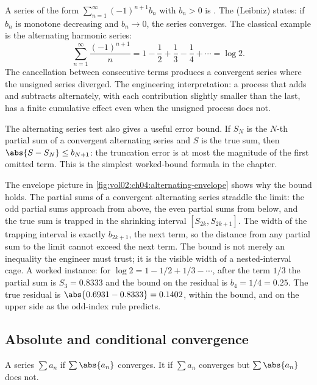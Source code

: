 A series of the form $\sum_{n=1}^{\infty} (-1)^{n+1} b_{n}$ with
$b_{n} > 0$ is . The  (Leibniz) states: if $b_{n}$ is monotone decreasing and
$b_{n} \to 0$, the series converges. The classical example is the
alternating harmonic series:
\[
\sum_{n=1}^{\infty} \frac{(-1)^{n+1}}{n} = 1 - \frac{1}{2} + \frac{1}{3}
- \frac{1}{4} + \cdots = \log 2.
\]
The cancellation between consecutive terms produces a convergent series
where the unsigned series diverged. The engineering interpretation: a
process that adds and subtracts alternately, with each contribution
slightly smaller than the last, has a finite cumulative effect even
when the unsigned process does not.

The alternating series test also gives a useful error bound. If $S_{N}$
is the $N$-th partial sum of a convergent alternating series and $S$ is
the true sum, then $\abs{S - S_{N}} \leq b_{N+1}$: the truncation error
is at most the magnitude of the first omitted term. This is the
simplest worked-bound formula in the chapter.



The envelope picture in \autoref{fig:vol02:ch04:alternating-envelope}
shows why the bound holds. The partial sums of a convergent alternating
series straddle the limit: the odd partial sums approach from above, the
even partial sums from below, and the true sum is trapped in the
shrinking interval $[S_{2k}, S_{2k+1}]$. The width of the trapping
interval is exactly $b_{2k+1}$, the next term, so the distance from any
partial sum to the limit cannot exceed the next term. The bound is not
merely an inequality the engineer must trust; it is the visible width of
a nested-interval cage. A worked instance: for $\log 2 = 1 - 1/2 + 1/3 -
\cdots$, after the term $1/3$ the partial sum is $S_{3} = 0.8333$ and the
bound on the residual is $b_{4} = 1/4 = 0.25$. The true residual is
$\abs{0.6931 - 0.8333} = 0.1402$, within the bound, and on the upper
side as the odd-index rule predicts.

\subsection{Absolute and conditional convergence}

A series $\sum a_{n}$  if
$\sum \abs{a_{n}}$ converges. It  if
$\sum a_{n}$ converges but $\sum \abs{a_{n}}$ does not.

